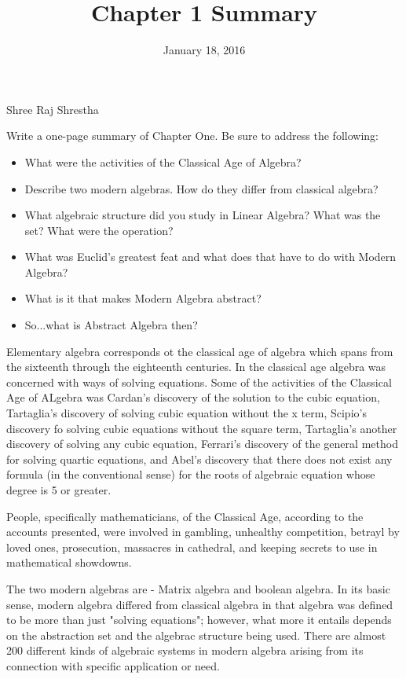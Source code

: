 \documentclass[11pt]{amsart}
\title{Chapter 1 Summary}
\date{January 18, 2016}                                           %
\begin{document}
\maketitle

Shree Raj Shrestha

Write a one-page summary of Chapter One. Be sure to address the following:
\begin{itemize}
\item What were the activities of the Classical Age of Algebra?
\item Describe two modern algebras. How do they differ from classical algebra?
\item What algebraic structure did you study in Linear Algebra? What was the set? What were the operation?
\item What was Euclid's greatest feat and what does that have to do with Modern Algebra?
\item What is it that makes Modern Algebra abstract?
\item So...what is Abstract Algebra then?
\end{itemize}

Elementary algebra corresponds ot the classical age of algebra which spans from the sixteenth through the eighteenth centuries. In the classical age algebra was concerned with ways of solving equations. Some of the activities of the Classical Age of ALgebra was Cardan's discovery of the solution to the cubic equation, Tartaglia's discovery of solving cubic equation without the x term, Scipio's discovery fo solving cubic equations without the square term, Tartaglia's another discovery of solving any cubic equation, Ferrari's discovery of the general method for solving quartic equations, and Abel's discovery that there does not exist any formula (in the conventional sense) for the roots of algebraic equation whose degree is 5 or greater.

People, specifically mathematicians, of the Classical Age, according to the accounts presented, were involved in gambling, unhealthy competition, betrayl by loved ones, prosecution, massacres in cathedral, and keeping secrets to use in mathematical showdowns.

The two modern algebras are - Matrix algebra and boolean algebra. In its basic sense, modern algebra differed from classical algebra in that algebra was defined to be more than just "solving equations"; however, what more it entails depends on the abstraction set and the algebrac structure being used. There are almost 200 different kinds of algebraic systems in modern algebra arising from its connection with specific application or need.
\end{document}
